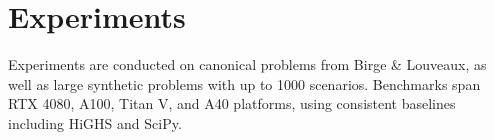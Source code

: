 \section{Experiments}
Experiments are conducted on canonical problems from Birge \& Louveaux, as well as large synthetic problems with up to 1000 scenarios. Benchmarks span RTX 4080, A100, Titan V, and A40 platforms, using consistent baselines including HiGHS and SciPy.